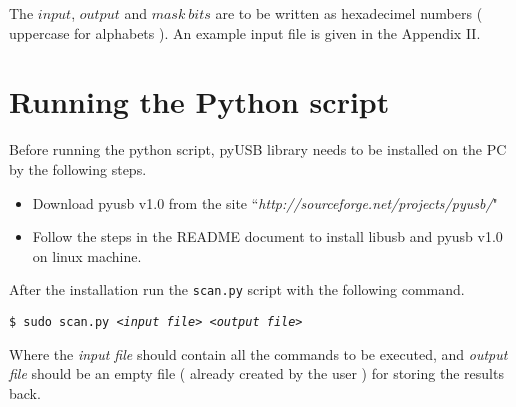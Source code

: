 \documentclass[a4paper,11pt]{article}
\begin{document}
The $input$, $output$ and $mask\:bits$ are to be written as hexadecimel numbers ( uppercase for alphabets ). An example input file is given in the Appendix II.

\section{Running the Python script}
Before running the python script, pyUSB library needs to be installed on the PC by the following steps.

\begin{itemize}
\item Download pyusb v1.0 from the site ``\textit{http://sourceforge.net/projects/pyusb/}"
\item Follow the steps in the README document to install libusb and pyusb v1.0 on linux machine.
\end{itemize}

After the installation run the \texttt{scan.py} script with the following command.
\begin{center}
\texttt{\$ sudo scan.py \textit{<input file>} \textit{<output file>}} 
\end{center}

Where the \textit{input file} should contain all the commands to be executed, and \textit{output file} should be an empty file ( already created by the user ) for storing the results back.



\newpage
\end{document}
